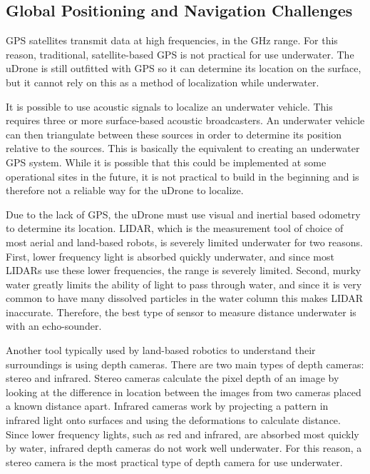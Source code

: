 \subsection{Global Positioning and Navigation Challenges}
GPS satellites transmit data at high frequencies, in the GHz range. For this reason, traditional, satellite-based GPS is not practical for use underwater. The uDrone is still outfitted with GPS so it can determine its location on the surface, but it cannot rely on this as a method of localization while underwater.

It is possible to use acoustic signals to localize an underwater vehicle. This requires three or more surface-based acoustic broadcasters. An underwater vehicle can then triangulate between these sources in order to determine its position relative to the sources. This is basically the equivalent to creating an underwater GPS system. While it is possible that this could be implemented at some operational sites in the future, it is not practical to build in the beginning and is therefore not a reliable way for the uDrone to localize.

Due to the lack of GPS, the uDrone must use visual and inertial based odometry to determine its location. LIDAR, which is the measurement tool of choice of most aerial and land-based robots, is severely limited underwater for two reasons. First, lower frequency light is absorbed quickly underwater, and since most LIDARs use these lower frequencies, the range is severely limited. Second, murky water greatly limits the ability of light to pass through water, and since it is very common to have many dissolved particles in the water column this makes LIDAR inaccurate. Therefore, the best type of sensor to measure distance underwater is with an echo-sounder. 

Another tool typically used by land-based robotics to understand their surroundings is using depth cameras. There are two main types of depth cameras: stereo and infrared. Stereo cameras calculate the pixel depth of an image by looking at the difference in location between the images from two cameras placed a known distance apart. Infrared cameras work by projecting a pattern in infrared light onto surfaces and using the deformations to calculate distance. Since lower frequency lights, such as red and infrared, are absorbed most quickly by water, infrared depth cameras do not work well underwater. For this reason, a stereo camera is the most practical type of depth camera for use underwater. 

